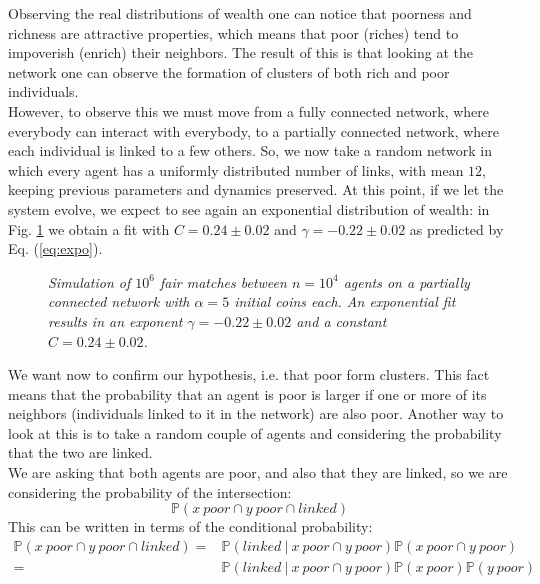 Observing the real distributions of wealth one can notice that poorness and richness are attractive properties, which means that poor (riches) tend to impoverish (enrich) their neighbors.
The result of this is that looking at the network one can observe the formation of clusters of both rich and poor individuals. \\
However, to observe this we must move from a fully connected network, where everybody can interact with everybody, to a partially connected network, where each individual is linked to a few others.
So, we now take a random network in which every agent has a uniformly distributed number of links, with mean $12$, keeping previous parameters and dynamics preserved.
At this point, if we let the system evolve, we expect to see again an exponential distribution of wealth: in Fig. \ref{fig:fixedExpo} we obtain a fit with $C = 0.24 \pm 0.02$ and $\gamma = -0.22 \pm 0.02$ as predicted by Eq. (\ref{eq:expo}).
\begin{figure}[H]
    \centering
    \scalebox{.7}{}
    \caption{\emph{Simulation of $10^6$ fair matches between $n = 10^4$ agents on a partially connected network with $\alpha = 5$ initial coins each. 
                    An exponential fit results in an exponent $\gamma = -0.22 \pm 0.02$ and a constant $C = 0.24 \pm 0.02$.}}
    \label{fig:fixedExpo}
\end{figure}
We want now to confirm our hypothesis, i.e. that poor form clusters.
This fact means that the probability that an agent is poor is larger if one or more of its neighbors (individuals linked to it in the network) are also poor. Another way to look at this is to take a random couple of agents and considering the probability that the two are linked. \\
We are asking that both agents are poor, and also that they are linked, so we are considering the probability of the intersection:
\begin{equation*}
    \mathbb{P}(x \ poor \cap y \ poor \cap linked)
\end{equation*}
This can be written in terms of the conditional probability:
\begin{equation*}
    \begin{split}
        \mathbb{P}(x \ poor \cap y \ poor \cap linked) =& \mathbb{P}(linked \ \vert \ x \ poor \cap y \ poor) \mathbb{P}(x \ poor \cap y \ poor)\\
	                                                   =& \mathbb{P}(linked \ \vert \ x \ poor \cap y \ poor) \mathbb{P}(x \ poor)\mathbb{P}(y \ poor)
    \end{split}
\end{equation*}
